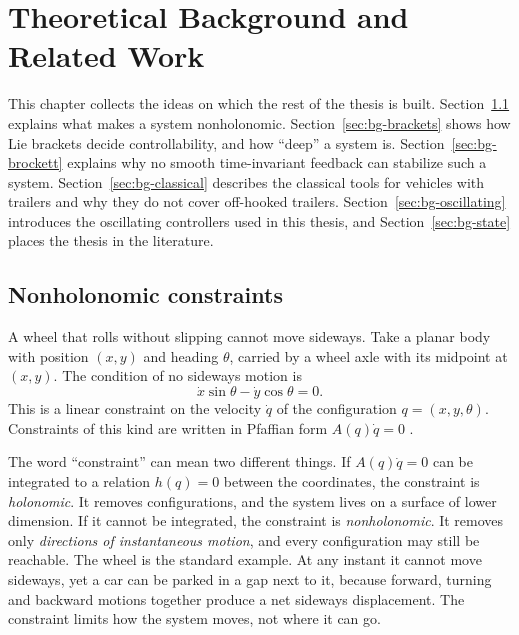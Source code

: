 
\chapter{Theoretical Background and Related Work}
\label{ch:background}

This chapter collects the ideas on which the rest of the thesis is built.
Section~\ref{sec:bg-constraints} explains what makes a system nonholonomic.
Section~\ref{sec:bg-brackets} shows how Lie brackets decide controllability, and
how ``deep'' a system is. Section~\ref{sec:bg-brockett} explains why no smooth
time-invariant feedback can stabilize such a system.
Section~\ref{sec:bg-classical} describes the classical tools for vehicles with
trailers and why they do not cover off-hooked trailers.
Section~\ref{sec:bg-oscillating} introduces the oscillating controllers used in
this thesis, and Section~\ref{sec:bg-state} places the thesis in the literature.

\section{Nonholonomic constraints}
\label{sec:bg-constraints}

A wheel that rolls without slipping cannot move sideways. Take a planar body
with position $(x,y)$ and heading $\theta$, carried by a wheel axle with its
midpoint at $(x,y)$. The condition of no sideways motion is
\begin{equation}
  \dot x\sin\theta-\dot y\cos\theta=0 .
  \label{eq:bg-rolling}
\end{equation}
This is a linear constraint on the velocity $\dot q$ of the configuration
$q=(x,y,\theta)$. Constraints of this kind are written in Pfaffian form
$A(q)\dot q=0$ \cite{deluca1995}.

The word ``constraint'' can mean two different things. If
$A(q)\dot q=0$ can be integrated to a relation $h(q)=0$ between the
coordinates, the constraint is \emph{holonomic}. It removes configurations, and
the system lives on a surface of lower dimension. If it cannot be integrated,
the constraint is \emph{nonholonomic}. It removes only \emph{directions of
instantaneous motion}, and every configuration may still be reachable. The
wheel is the standard example. At any instant it cannot move sideways, yet a
car can be parked in a gap next to it, because forward, turning and backward
motions together produce a net sideways displacement. The constraint limits how
the system moves, not where it can go.

